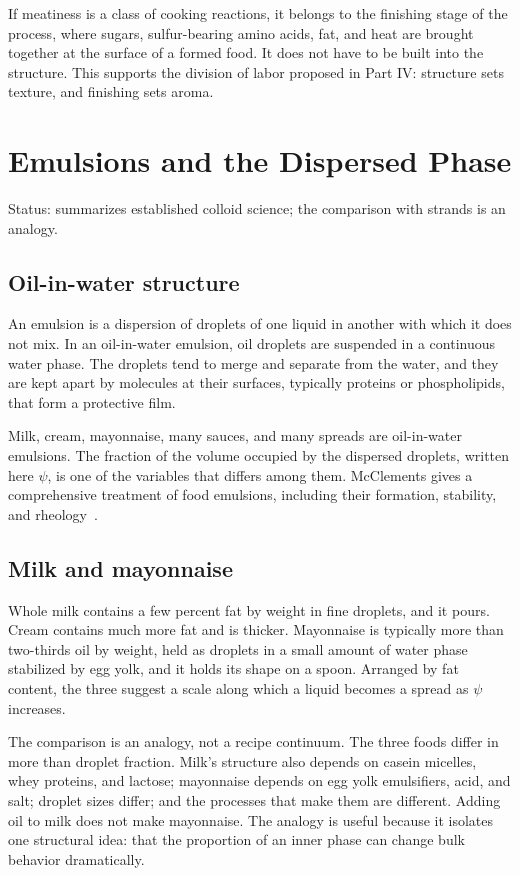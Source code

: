 \documentclass[11pt,openany]{book}
\theoremstyle{definition}
\begin{document}
If meatiness is a class of cooking reactions, it belongs to the finishing stage of the process, where sugars, sulfur-bearing amino acids, fat, and heat are brought together at the surface of a formed food. It does not have to be built into the structure. This supports the division of labor proposed in Part IV: structure sets texture, and finishing sets aroma.

\chapter{Emulsions and the Dispersed Phase}\label{ch:emulsion}

Status: summarizes established colloid science; the comparison with strands is an analogy.

\section{Oil-in-water structure}

An emulsion is a dispersion of droplets of one liquid in another with which it does not mix. In an oil-in-water emulsion, oil droplets are suspended in a continuous water phase. The droplets tend to merge and separate from the water, and they are kept apart by molecules at their surfaces, typically proteins or phospholipids, that form a protective film.

Milk, cream, mayonnaise, many sauces, and many spreads are oil-in-water emulsions. The fraction of the volume occupied by the dispersed droplets, written here $\psi$, is one of the variables that differs among them. McClements gives a comprehensive treatment of food emulsions, including their formation, stability, and rheology~\cite{mcclements2015}.

\section{Milk and mayonnaise}

Whole milk contains a few percent fat by weight in fine droplets, and it pours. Cream contains much more fat and is thicker. Mayonnaise is typically more than two-thirds oil by weight, held as droplets in a small amount of water phase stabilized by egg yolk, and it holds its shape on a spoon. Arranged by fat content, the three suggest a scale along which a liquid becomes a spread as $\psi$ increases.

The comparison is an analogy, not a recipe continuum. The three foods differ in more than droplet fraction. Milk's structure also depends on casein micelles, whey proteins, and lactose; mayonnaise depends on egg yolk emulsifiers, acid, and salt; droplet sizes differ; and the processes that make them are different. Adding oil to milk does not make mayonnaise. The analogy is useful because it isolates one structural idea: that the proportion of an inner phase can change bulk behavior dramatically.
\end{document}
